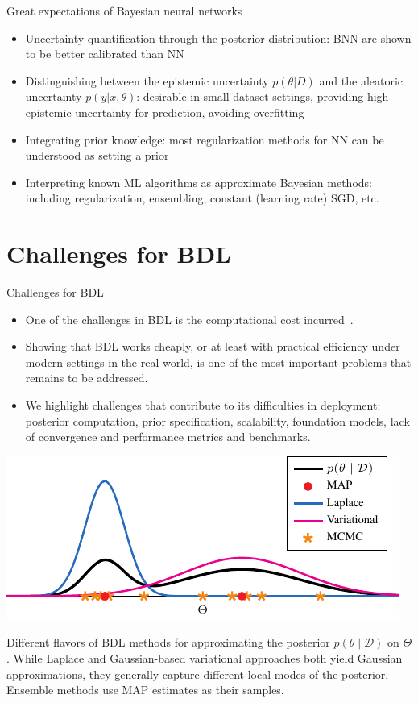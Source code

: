 \documentclass[9pt]{beamer}
\begin{document}
\begin{frame}{Great expectations of Bayesian neural networks}
\begin{itemize}[<+->]
	\item Uncertainty quantification through the posterior distribution: BNN are shown to be better calibrated than NN
	\item Distinguishing between the epistemic uncertainty $p(\theta|D)$ and the aleatoric uncertainty $p(y|x,\theta)$: desirable in small dataset settings, providing high epistemic uncertainty for prediction, avoiding overfitting
	\item Integrating prior knowledge: most regularization methods for NN can be understood as setting a prior
	\item Interpreting known ML algorithms as approximate Bayesian methods: including regularization, ensembling, constant (learning rate) SGD, etc. 
\end{itemize}
\end{frame}


\section{Challenges for BDL}

\begin{frame}{Challenges for BDL}
\begin{itemize}[<+->]
	\item One of the challenges in BDL is the \alert{computational cost} incurred~\citep{izmailov2021}. 
	\item Showing that BDL works cheaply, or at least with practical efficiency under modern settings in the real world, is one of the most important problems that remains to be addressed.  %
	\item We highlight challenges that contribute to its difficulties in deployment: \alert{posterior computation}, \alert{prior specification}, \alert{scalability},  \alert{foundation models}, \alert{lack of convergence} and \alert{performance metrics and benchmarks}.
\end{itemize}
\begin{center}
	\includegraphics[width=.7\textwidth]{figures_julyan/bdl/bdl_methods}
\end{center}
    Different flavors of BDL methods for approximating the posterior \(p(\theta \mid \mathcal{D})\) on \(\Theta\).
    While Laplace and Gaussian-based variational approaches both yield Gaussian approximations, they generally capture different local modes of the posterior.
    Ensemble methods use MAP estimates as their samples.
\end{frame}
\end{document}
